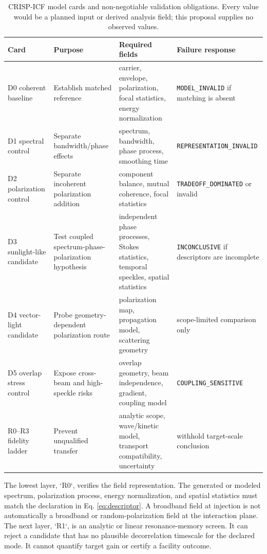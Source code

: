 \documentclass[conference]{../../../../Conference-LaTeX-template_10-17-19/IEEEtran}
\begin{document}
\begin{table}[!t]
\caption{CRISP-ICF model cards and non-negotiable validation obligations. Every value would be a planned input or derived analysis field; this proposal supplies no observed values.}
\label{tab:cards}
\centering
\small
\begin{tabularx}{\textwidth}{lYYY}
\toprule
Card & Purpose & Required fields & Failure response \\
\midrule
D0 coherent baseline & Establish matched reference & carrier, envelope, polarization, focal statistics, energy normalization & \texttt{MODEL\_INVALID} if matching is absent \\
D1 spectral control & Separate bandwidth/phase effects & spectrum, bandwidth, phase process, smoothing time & \texttt{REPRESENTATION\_INVALID} \\
D2 polarization control & Separate incoherent polarization addition & component balance, mutual coherence, focal statistics & \texttt{TRADEOFF\_DOMINATED} or invalid \\
D3 sunlight-like candidate & Test coupled spectrum-phase-polarization hypothesis & independent phase processes, Stokes statistics, temporal speckles, spatial statistics & \texttt{INCONCLUSIVE} if descriptors are incomplete \\
D4 vector-light candidate & Probe geometry-dependent polarization route & polarization map, propagation model, scattering geometry & scope-limited comparison only \\
D5 overlap stress control & Expose cross-beam and high-speckle risks & overlap geometry, beam independence, gradient, coupling model & \texttt{COUPLING\_SENSITIVE} \\
R0--R3 fidelity ladder & Prevent unqualified transfer & analytic scope, wave/kinetic model, transport compatibility, uncertainty & withhold target-scale conclusion \\
\bottomrule
\end{tabularx}
\end{table}

The lowest layer, `R0`, verifies the field representation. The generated or modeled spectrum, polarization process, energy normalization, and spatial statistics must match the declaration in Eq. \eqref{eq:descriptor}. A broadband field at injection is not automatically a broadband or random-polarization field at the interaction plane. The next layer, `R1`, is an analytic or linear resonance-memory screen. It can reject a candidate that has no plausible decorrelation timescale for the declared mode. It cannot quantify target gain or certify a facility outcome.
\end{document}
